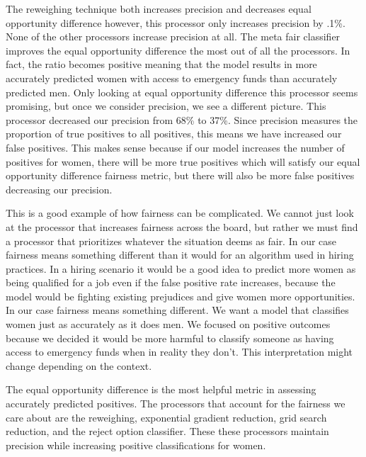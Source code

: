 \documentclass[water,article,submit,moreauthors,pdftex]{mdpi}
\begin{document}
The reweighing technique both increases precision and decreases equal
opportunity difference however, this processor only increases precision
by .1\%. None of the other processors increase precision at all. The
meta fair classifier improves the equal opportunity difference the most
out of all the processors. In fact, the ratio becomes positive meaning
that the model results in more accurately predicted women with access to
emergency funds than accurately predicted men. Only looking at equal
opportunity difference this processor seems promising, but once we
consider precision, we see a different picture. This processor decreased
our precision from 68\% to 37\%. Since precision measures the proportion
of true positives to all positives, this means we have increased our
false positives. This makes sense because if our model increases the
number of positives for women, there will be more true positives which
will satisfy our equal opportunity difference fairness metric, but there
will also be more false positives decreasing our precision.

This is a good example of how fairness can be complicated. We cannot
just look at the processor that increases fairness across the board, but
rather we must find a processor that prioritizes whatever the situation
deems as fair. In our case fairness means something different than it
would for an algorithm used in hiring practices. In a hiring scenario it
would be a good idea to predict more women as being qualified for a job
even if the false positive rate increases, because the model would be
fighting existing prejudices and give women more opportunities. In our
case fairness means something different. We want a model that classifies
women just as accurately as it does men. We focused on positive outcomes
because we decided it would be more harmful to classify someone as
having access to emergency funds when in reality they don't. This
interpretation might change depending on the context.

The equal opportunity difference is the most helpful metric in assessing
accurately predicted positives. The processors that account for the
fairness we care about are the reweighing, exponential gradient
reduction, grid search reduction, and the reject option classifier.
These these processors maintain precision while increasing positive
classifications for women.
\end{document}
